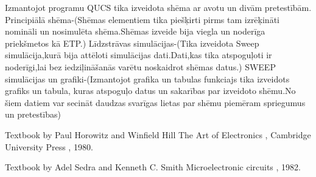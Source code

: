 \documentclass{report}
\begin{document}
Izmantojot programu QUCS\cite{gramata1} tika izveidota shēma ar avotu un divām pretestībām.
Principiālā shēma-(Shēmas elementiem\cite{gramata2} tika piešķirti pirms tam izrēķināti nomināli un nosimulēta shēma.Shēmas izveide bija viegla un noderīga priekšmetos kā ETP.)
Līdzstrāvas simulācijas-(Tika izveidota Sweep simulācija,kurā bija attēloti simulācijas dati.Dati,kas tika atspoguļoti ir noderīgi,lai bez iedziļināšanās varētu noskaidrot shēmas datus.)
SWEEP simulācijas un grafiki-(Izmantojot grafika un tabulas funkciajs tika izveidots grafiks un tabula, kuras atspoguļo datus un sakarības par izveidoto shēmu.No šiem datiem var secināt daudzas svarīgas lietas par shēmu piemēram spriegumus un pretestības)



\begin{thebibliography}{9}
Textbook by Paul Horowitz and Winfield Hill
The Art of Electronics , Cambridge University Press , 1980.

Textbook by Adel Sedra and Kenneth C. Smith
Microelectronic circuits , 1982.
\end{thebibliography}
\end{document}
